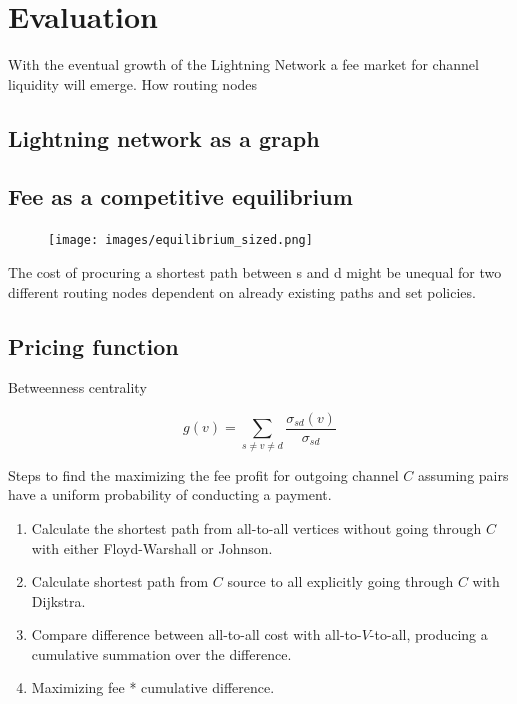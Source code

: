 \chapter{Evaluation}

With the eventual growth of the Lightning Network a fee market for channel liquidity will emerge. How routing nodes 

\section{Lightning network as a graph}




\section{Fee as a competitive equilibrium}



\begin{figure}[!htb]
	\hspace*{-0.7cm} 
	\centering
	\texttt{[image: images/equilibrium\_sized.png]}
	\caption{ 
		}
		\label{fig:equilibrium}
		\hspace*{2mm} 	
\end{figure}



The cost of procuring a shortest path between s and d might be unequal for two different routing nodes dependent on already existing paths and set policies.

\section{Pricing function}

Betweenness centrality

\[ g(v) = \sum_{s \neq v \neq d}\frac{\sigma_{sd}(v)}{\sigma_{sd}} \]

Steps to find the maximizing the fee profit for outgoing channel $C$ assuming pairs have a uniform probability of conducting a payment.

\begin{enumerate}
	\item Calculate the shortest path from all-to-all vertices without going through $C$ with either Floyd-Warshall or Johnson. 
	\item Calculate shortest path from $C$ source to all explicitly going through $C$ with Dijkstra.
	\item Compare difference between all-to-all cost with all-to-$V$-to-all, producing a cumulative summation over the difference.
	\item Maximizing fee * cumulative difference.
\end{enumerate} 

